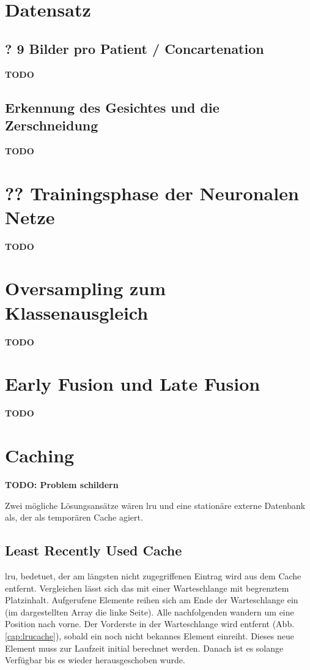 \clearpage
\section{Datensatz}\label{dataset}

\subsection{? 9 Bilder pro Patient / Concartenation}\label{cutting}
\textbf{TODO}

\subsection{Erkennung des Gesichtes und die Zerschneidung}\label{cutting2}
\textbf{TODO}




\section{?? Trainingsphase der Neuronalen Netze}\label{training}
\textbf{TODO}





\section{Oversampling zum Klassenausgleich}\label{oversamplingmethod}
\textbf{TODO}

\section{Early Fusion und Late Fusion}\label{fusionmethod}
\textbf{TODO}









\section{Caching}\label{caching}
\textbf{TODO: Problem schildern}


Zwei mögliche Lösungsansätze wären \ac{lru} und eine stationäre externe Datenbank als, der als temporären Cache agiert.

\subsection{Least Recently Used Cache}\label{lrucache}
\ac{lru}, bedetuet, der am längsten nicht zugegriffenen Eintrag wird aus dem Cache entfernt. Vergleichen lässt sich das mit einer Warteschlange mit begrenztem Platzinhalt. Aufgerufene Elemente reihen sich am Ende der Warteschlange ein (im dargestellten Array die linke Seite). Alle nachfolgenden wandern um eine Position nach vorne. Der Vorderste in der Warteschlange wird entfernt (Abb. \ref{cap:lrucache}), sobald ein noch nicht bekannes Element einreiht. Dieses neue Element muss zur Laufzeit initial berechnet werden. Danach ist es solange Verfügbar bis es wieder herausgeschoben wurde.

